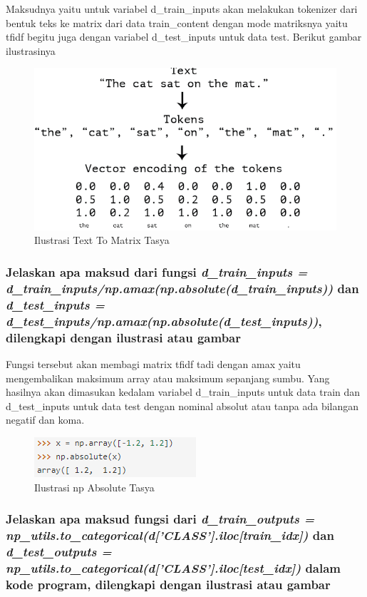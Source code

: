 Maksudnya yaitu untuk variabel d\_train\_inputs akan melakukan tokenizer dari bentuk teks ke matrix dari data train\_content dengan mode matriksnya yaitu tfidf begitu juga dengan variabel d\_test\_inputs untuk data test. Berikut gambar ilustrasinya
\begin{figure}[ht]
\centering
\includegraphics[scale=0.5]{figures/Chapter 7/1164086/Teori/chapter7tasya2.png}
\caption{Ilustrasi Text To Matrix Tasya}
\label{Teori}
\end{figure}

\subsubsection{Jelaskan apa maksud dari fungsi \emph{d\_train\_inputs = d\_train\_inputs/np.amax(np.absolute(d\_train\_inputs))} dan \emph{d\_test\_inputs = d\_test\_inputs/np.amax(np.absolute(d\_test\_inputs))}, dilengkapi dengan ilustrasi atau gambar}

Fungsi tersebut akan membagi matrix tfidf tadi dengan amax yaitu mengembalikan maksimum array atau maksimum sepanjang sumbu. Yang hasilnya akan dimasukan kedalam variabel d\_train\_inputs untuk data train dan d\_test\_inputs untuk data test dengan nominal absolut atau tanpa ada bilangan negatif dan koma.
\begin{figure}[ht]
\centering
\includegraphics[scale=0.5]{figures/Chapter 7/1164086/Teori/chapter7tasya4.png}
\caption{Ilustrasi np Absolute Tasya}
\label{Teori}
\end{figure}

\subsubsection{Jelaskan apa maksud fungsi dari \emph{d\_train\_outputs = np\_utils.to\_categorical(d['CLASS'].iloc[train\_idx])} dan \emph{d\_test\_outputs = np\_utils.to\_categorical(d['CLASS'].iloc[test\_idx])} dalam kode program, dilengkapi dengan ilustrasi atau gambar}

